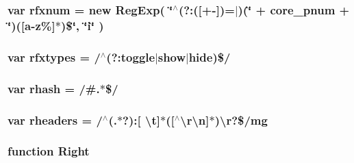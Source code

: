 \hypertarget{jquery-1_810_82_8js_a7907e208847275b29993c85031275f9f}{
\subsubsection[{rfxnum}]{\setlength{\rightskip}{0pt plus 5cm}var rfxnum = new Reg\-Exp( \char`\"{}$^\wedge$(?\-:(\mbox{[}+-\/\mbox{]})=$\vert$)(\char`\"{} + core\-\_\-pnum + \char`\"{})(\mbox{[}a-\/z\%\mbox{]}$\ast$)\$\char`\"{}, \char`\"{}i\char`\"{} )}}\label{jquery-1_810_82_8js_a7907e208847275b29993c85031275f9f}
\hypertarget{jquery-1_810_82_8js_a28b1e14ecaade6675453a292b2c1dba6}{
\subsubsection[{rfxtypes}]{\setlength{\rightskip}{0pt plus 5cm}var rfxtypes = /$^\wedge$(?\-:{\bf toggle}$\vert${\bf show}$\vert${\bf hide})\$/}}\label{jquery-1_810_82_8js_a28b1e14ecaade6675453a292b2c1dba6}
\hypertarget{jquery-1_810_82_8js_a6990b6955b6bec9dd39f3814cfb56d6d}{
\subsubsection[{rhash}]{\setlength{\rightskip}{0pt plus 5cm}var rhash = /\#.$\ast$\$/}}\label{jquery-1_810_82_8js_a6990b6955b6bec9dd39f3814cfb56d6d}
\hypertarget{jquery-1_810_82_8js_af506d11612139f03091db71089d92e8b}{
\subsubsection[{rheaders}]{\setlength{\rightskip}{0pt plus 5cm}var rheaders = /$^\wedge$(.$\ast$?)\-:\mbox{[} \textbackslash{}{\bf t}\mbox{]}$\ast$(\mbox{[}$^\wedge$\textbackslash{}r\textbackslash{}n\mbox{]}$\ast$)\textbackslash{}r?\$/mg}}\label{jquery-1_810_82_8js_af506d11612139f03091db71089d92e8b}
\hypertarget{jquery-1_810_82_8js_ac7f66efc33d974809d85fc5bdb00c6eb}{
\subsubsection[{Right}]{\setlength{\rightskip}{0pt plus 5cm}function Right}}\label{jquery-1_810_82_8js_ac7f66efc33d974809d85fc5bdb00c6eb}
